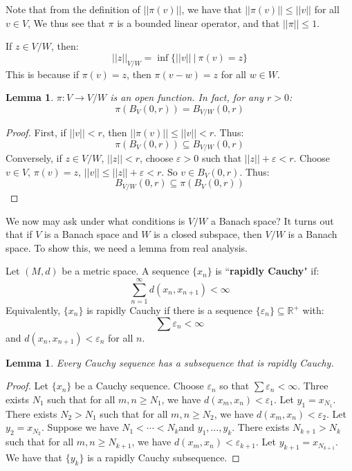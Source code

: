 \documentclass[a4paper,12pt]{report}
\newcommand{\varep}{ \varepsilon }
\newcommand{\sse} {\subseteq}
\newtheorem{lemma}[theorem]{Lemma}
\newenvironment{definition}[1][Definition.]{\begin{trivlist}
\item[\hskip \labelsep {\bfseries #1}]}{\end{trivlist}}
\newenvironment{remark}[1][Remark.]{\begin{trivlist}
\item[\hskip \labelsep {\bfseries #1}]}{\end{trivlist}}
\begin{document}
	\begin{remark}
	Note that from the definition of $||\pi(v)||$, we have that $||\pi(v)|| \leq ||v||$ for all $v \in V$, We thus see that $\pi$ is a bounded linear operator, and that $||\pi|| \leq 1$.
	\end{remark}
	
	\begin{remark}
	If $z \in V / W$, then:
	\[ ||z||_{V/W} = \inf \bigg\{ ||v|| ~\big|~ \pi(v) = z \bigg\} \]
	This is because if $\pi(v) = z$, then $\pi(v - w) = z$ for all $w \in W$.
	\end{remark}
	
	\begin{lemma}
	$\pi : V \rightarrow V / W$ is an open function. In fact, for any $r > 0$:
	\[ \pi(B_V(0, r)) = B_{V/W}(0, r) \]
	\end{lemma}
	\begin{proof}
	First, if $||v|| < r$, then $||\pi(v)|| \leq ||v|| < r$. Thus:
	\[ \pi(B_V(0, r)) \sse B_{V/W}(0, r) \]
	Conversely, if $z \in V / W$, $||z|| < r$, choose $\varep > 0$ such that $||z|| + \varep < r$. Choose $v \in V$, $\pi(v) = z$, $||v|| \leq ||z|| + \varep < r$. So $v \in B_V(0, r)$. Thus:
	\[ B_{V/W}(0, r) \sse \pi(B_V(0, r)) \]
	\end{proof}
	
	\noindent We now may ask under what conditions is $V / W$ a Banach space? It turns out that if $V$ is a Banach space and $W$ is a closed subspace, then $V/W$ is a Banach space. To show this, we need a lemma from real analysis.
	
	\begin{definition}
	Let $(M, d)$ be a metric space. A sequence $\{x_n\}$ is ``\textbf{rapidly Cauchy}" if:
	\[ \sum_{n=1}^\infty d(x_n, x_{n+1}) < \infty \]
	Equivalently, $\{x_n\}$ is rapidly Cauchy if there is a sequence $\{\varep_n\} \sse \mathbb{R}^+$ with:
	\[ \sum \varep_n < \infty \]
	and $d(x_n, x_{n+1}) < \varep_n$ for all $n$.
	\end{definition}
	
	\begin{lemma}
	Every Cauchy sequence has a subsequence that is rapidly Cauchy.
	\end{lemma}
	\begin{proof}
	Let $\{x_n\}$ be a Cauchy sequence. Choose $\varep_n$ so that $\sum \varep_n < \infty$. Three exists $N_1$ such that for all $m, n \geq N_1$, we have $d(x_m, x_n) < \varep_1$. Let $y_1 = x_{N_1}$. There exists $N_2 > N_1$ such that for all $m, n \geq N_2$, we have $d(x_m, x_n) < \varep_2$. Let $y_2 = x_{N_2}$. Suppose we have $N_1 < \cdots <  N_k$and $y_1, \ldots, y_k$. There exists $N_{k+1} > N_k$ such that for all $m, n \geq N_{k+1}$, we have $d(x_m, x_n) < \varep_{k+1}$. Let $y_{k+1} = x_{N_{k+1}}$. We have that $\{y_k\}$ is a rapidly Cauchy subsequence.
	\end{proof}
	
\end{document}
